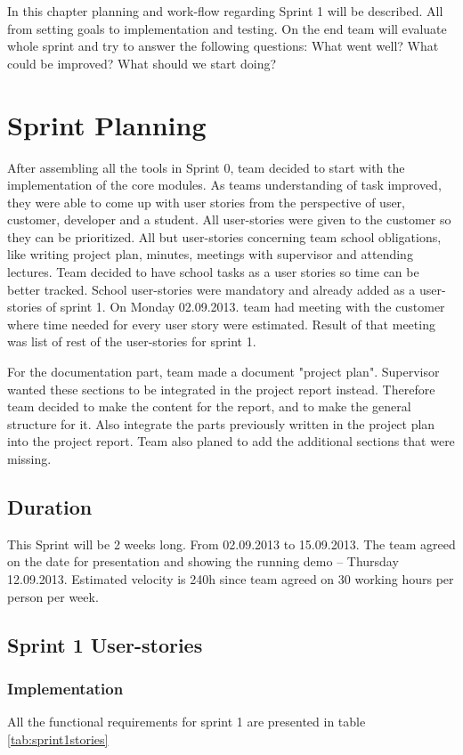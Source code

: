 In this chapter planning and work-flow regarding Sprint 1 will be described. 
All from setting  goals to implementation and testing. On the end team will evaluate whole sprint and try to answer the following questions: What went well? What could be improved? What should we start doing?  


\section{Sprint Planning}
After assembling all the tools in Sprint 0, team decided to start with the implementation of the core modules.
As teams understanding of task improved, they were able to come up with user stories from the perspective of user, customer, developer and a student.
All user-stories were given to the customer so they can be prioritized. 
All but user-stories concerning team school obligations, like writing project plan, minutes, meetings with supervisor and attending lectures.
Team decided to have school tasks as a user stories so time can be better tracked.
School user-stories were mandatory and already added as a user-stories of sprint 1.
On Monday 02.09.2013. team had meeting with the customer where time needed for every user story were estimated.
Result of that meeting was list of rest of the user-stories for sprint 1.

For the documentation part, team made a document "project plan". 
Supervisor wanted these sections to be integrated in the project report instead. 
Therefore team decided to make the content for the report, and to make the general structure for it. 
Also integrate the parts previously written in the project plan into the project report. 
Team also planed to add the additional sections that were missing.

\subsection{Duration}
This Sprint will be 2 weeks long. From 02.09.2013 to 15.09.2013.
The team agreed on the date for presentation and showing the running demo -- Thursday 12.09.2013.
Estimated velocity is 240h since team agreed on 30 working hours per person per week.

\subsection{Sprint 1 User-stories}

\subsubsection*{Implementation}
All the functional requirements for sprint 1 are presented in table \ref{tab:sprint1stories}

